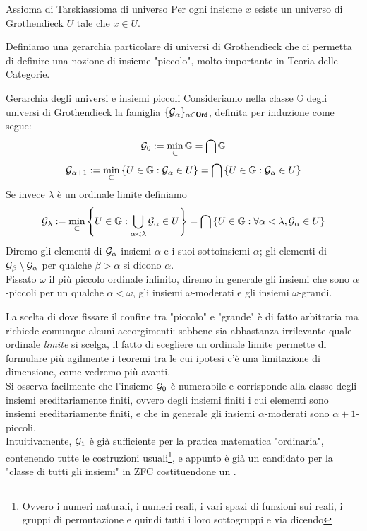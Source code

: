 \documentclass[openany]{book}
\begin{document}
\newcommand\Ord{\catname{Ord}}
\begin{axiom}{Assioma di Tarski}{assioma di universo}
    Per ogni insieme $x$ esiste un universo di Grothendieck $U$ tale che $x \in U$.
\end{axiom}

Definiamo una gerarchia particolare di universi di Grothendieck che ci permetta di definire una nozione di insieme "piccolo", molto importante in Teoria delle Categorie.

\begin{definition}{Gerarchia degli universi e insiemi piccoli}{}
    Consideriamo nella classe $\mathbb{G}$ degli universi di Grothendieck la famiglia $\{\G_\alpha\}_{\alpha \in \Ord}$, definita per induzione come segue:
        \[ \mathcal{G}_0 := \min_{\subset} \mathbb{G}=\bigcap\mathbb{G} \]
        \[ \mathcal{G}_{\alpha+1} := \min_{\subset} \left\{ U \in \mathbb{G} : \mathcal{G}_\alpha \in U \right\} = \bigcap \left\{ U \in \mathbb{G} : \mathcal{G}_\alpha \in U \right\}\]
    Se invece $\lambda$ è un ordinale limite definiamo
        \[ \mathcal{G}_\lambda := \min_{\subset}\left\{ U \in \mathbb{G} : \bigcup_{\alpha < \lambda} \mathcal{G}_\alpha \in U\right\} = \bigcap\left\{ U \in \mathbb{G} : \forall \alpha < \lambda, \mathcal{G}_\alpha \in U \right\} \]
    Diremo gli elementi di $\mathcal{G}_\alpha$ insiemi $\alpha$ e i suoi sottoinsiemi $\alpha$; gli elementi di $\mathcal{G}_\beta\setminus\mathcal{G}_\alpha$ per qualche $\beta > \alpha$ si dicono $\alpha$.\\
    Fissato $\omega$ il più piccolo ordinale infinito, diremo in generale  gli insiemi che sono $\alpha$-piccoli per un qualche $\alpha <\omega$,  gli insiemi $\omega$-moderati e  gli insiemi $\omega$-grandi.
\end{definition}

La scelta di dove fissare il confine tra "piccolo" e "grande" è di fatto arbitraria ma richiede comunque alcuni accorgimenti: sebbene sia abbastanza irrilevante quale ordinale \textit{limite} si scelga, il fatto di scegliere un ordinale limite permette di formulare più agilmente i teoremi tra le cui ipotesi c'è una limitazione di dimensione, come vedremo più avanti.\\
Si osserva facilmente che l'insieme $\mathcal{G}_0$ è numerabile e corrisponde alla classe degli insiemi ereditariamente finiti, ovvero degli insiemi finiti i cui elementi sono insiemi ereditariamente finiti, e che in generale gli insiemi $\alpha$-moderati sono $\alpha+1$-piccoli.\\
Intuitivamente, $\mathcal{G}_1$ è già sufficiente per la pratica matematica "ordinaria", contenendo tutte le costruzioni usuali\footnote{Ovvero i numeri naturali, i numeri reali, i vari spazi di funzioni sui reali, i gruppi di permutazione e quindi tutti i loro sottogruppi e via dicendo}, e appunto è già un candidato per la "classe di tutti gli insiemi" in ZFC costituendone un . 
\end{document}
